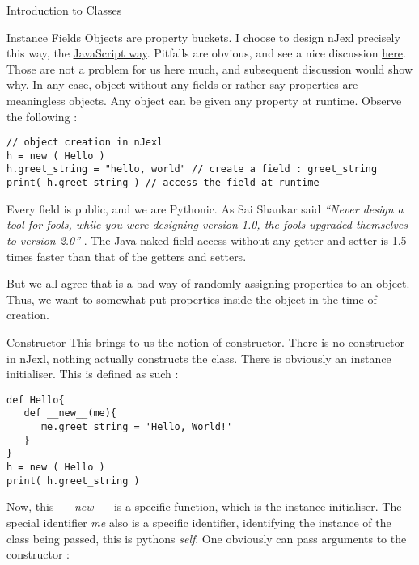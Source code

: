 \begin{section}{Introduction to Classes}
\begin{subsection}{Instance Fields}
Objects are property buckets. 
I choose to design nJexl precisely this way, the \href{http://www.w3schools.com/js/js_objects.asp}{JavaScript way}.
Pitfalls are obvious, and see a nice discussion \href{http://www.2ality.com/2012/01/objects-as-maps.html}{here}.
Those are not a problem for us here much, and subsequent discussion would show why.
In any case, object without any fields or rather say properties are meaningless objects.
Any object can be given any property at runtime. Observe the following :

\begin{center}\begin{minipage}{\linewidth}
\begin{lstlisting}[style=JexlStyle]
// object creation in nJexl
h = new ( Hello ) 
h.greet_string = "hello, world" // create a field : greet_string
print( h.greet_string ) // access the field at runtime
\end{lstlisting}  
\end{minipage}\end{center}

Every field is public, and we are Pythonic. 
As Sai Shankar said \emph{``Never design a tool for fools, while you were designing version 1.0, 
the fools upgraded themselves to version 2.0'' }. The Java naked field access without any getter 
and setter is 1.5 times faster than that of the getters and setters.

But we all agree that is a bad way of randomly assigning properties to an object.
Thus, we want to somewhat put properties inside the object in the time of creation. 
\end{subsection}

\begin{subsection}{Constructor}
This brings to us the notion of constructor. There is no constructor
in nJexl, nothing actually constructs the class. There is obviously an instance initialiser.
This is defined as such :
\begin{center}\begin{minipage}{\linewidth}
\begin{lstlisting}[style=JexlStyle]
def Hello{
   def __new__(me){
      me.greet_string = 'Hello, World!'
   } 
}
h = new ( Hello )
print( h.greet_string )
\end{lstlisting}  
\end{minipage}\end{center}
 
Now, this \emph{ \_\_new\_\_ } is a specific function, which is the instance initialiser.
The special identifier \emph{me} also is a specific identifier, identifying the instance
of the class being passed, this is pythons \emph{self}. One obviously can pass arguments
to the constructor :


\end{subsection}
\end{section}
